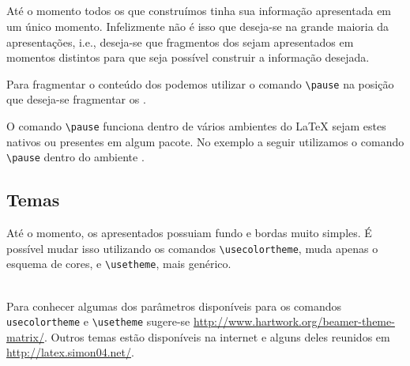 \subsection{}
Até o momento todos os  que construímos tinha sua informação
apresentada em um único momento. Infelizmente não é isso que deseja-se na grande
maioria da apresentações, i.e., deseja-se que fragmentos dos 
sejam apresentados em momentos distintos para que seja possível construir a
informação desejada.

Para fragmentar o conteúdo dos  podemos utilizar o comando
\lstinline!\pause! na posição que
deseja-se fragmentar os . \\
\begin{minipage}[c]{0.5\textwidth}
\end{minipage} \quad \vrule \quad
\begin{minipage}[c]{0.35\textwidth}
\end{minipage}

O comando \lstinline!\pause! funciona dentro de vários ambientes do LaTeX sejam
estes nativos ou presentes em algum pacote. No exemplo a seguir utilizamos o
comando \lstinline!\pause! dentro do ambiente . \\
\begin{minipage}[c]{0.5\textwidth}
\end{minipage} \quad \vrule \quad
\begin{minipage}[c]{0.35\textwidth}
\end{minipage}

\subsection{Temas}
Até o momento, os  apresentados possuiam fundo e bordas muito
simples. É possível mudar isso utilizando os comandos
\lstinline!\usecolortheme!, muda apenas o esquema de cores, e
\lstinline!\usetheme!, mais genérico. \\
 \\

Para conhecer algumas dos parâmetros disponíveis para os comandos
\lstinline!usecolortheme! e \lstinline!\usetheme! sugere-se
\url{http://www.hartwork.org/beamer-theme-matrix/}. Outros temas estão
disponíveis na internet e alguns deles reunidos em
\url{http://latex.simon04.net/}.
